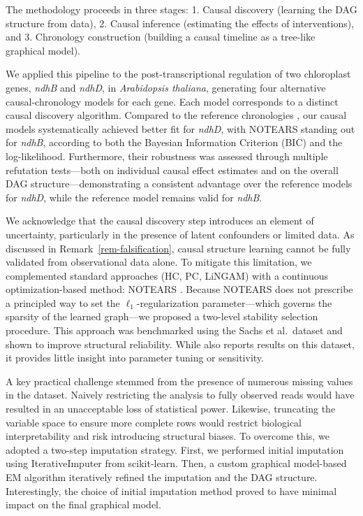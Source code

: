 \documentclass[
]{article}
\theoremstyle{definition}
\theoremstyle{remark}
\begin{document}
The methodology proceeds in three stages: 1. Causal discovery (learning
the DAG structure from data), 2. Causal inference (estimating the
effects of interventions), and 3. Chronology construction (building a
causal timeline as a tree-like graphical model).

We applied this pipeline to the post-transcriptional regulation of two
chloroplast genes, \emph{ndhB} and \emph{ndhD}, in \emph{Arabidopsis
thaliana}, generating four alternative causal-chronology models for each
gene. Each model corresponds to a distinct causal discovery algorithm.
Compared to the reference chronologies
, our causal models
systematically achieved better fit for \emph{ndhD}, with NOTEARS
standing out for \emph{ndhB}, according to both the Bayesian Information
Criterion (BIC) and the log-likelihood. Furthermore, their robustness
was assessed through multiple refutation tests---both on individual
causal effect estimates and on the overall DAG structure---demonstrating
a consistent advantage over the reference models for \emph{ndhD}, while
the reference model remains valid for \emph{ndhB}.

We acknowledge that the causal discovery step introduces an element of
uncertainty, particularly in the presence of latent confounders or
limited data. As discussed in Remark~\ref{rem-falsification}, causal
structure learning cannot be fully validated from observational data
alone. To mitigate this limitation, we complemented standard approaches
(HC, PC, LiNGAM) with a continuous optimization-based method: NOTEARS
. Because NOTEARS does not prescribe
a principled way to set the \(\ell_1\)-regularization parameter---which
governs the sparsity of the learned graph---we proposed a two-level
stability selection procedure. This approach was benchmarked using the
Sachs et al.~dataset and shown to improve structural reliability. While
 also reports results on this
dataset, it provides little insight into parameter tuning or
sensitivity.

A key practical challenge stemmed from the presence of numerous missing
values in the dataset. Naively restricting the analysis to fully
observed reads would have resulted in an unacceptable loss of
statistical power. Likewise, truncating the variable space to ensure
more complete rows would restrict biological interpretability and risk
introducing structural biases. To overcome this, we adopted a two-step
imputation strategy. First, we performed initial imputation using
IterativeImputer from scikit-learn. Then, a custom graphical model-based
EM algorithm iteratively refined the imputation and the DAG structure.
Interestingly, the choice of initial imputation method proved to have
minimal impact on the final graphical model.
\end{document}
